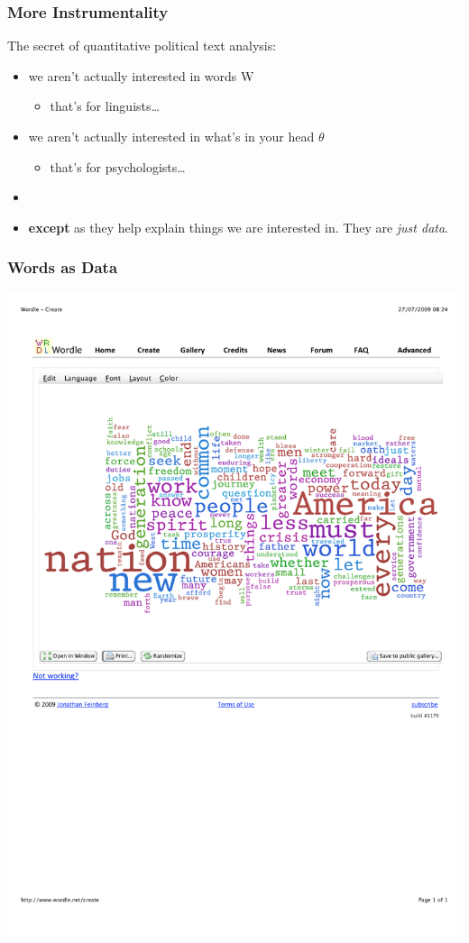 \documentclass[11pt,compress,professionalfonts]{beamer}
\newcommand{\ita}{\begin{itemize}}
\newcommand{\itm}{\item[]}
\newcommand{\itz}{\end{itemize}}
\begin{document}
\begin{frame}[t]\frametitle{More Instrumentality}

The secret of quantitative political text analysis:
\ita
\itm we aren't actually interested in words W
\ita
\itm that's for linguists\ldots
\itz
\itm we aren't actually interested in what's in your head $\theta$
\ita
\itm that's for psychologists\ldots
\itz
\itm
\itm \textbf{except} as they help explain things we are interested in.  They are \textit{just data}.
\itz


%
%
%

\end{frame}
\begin{frame}[t]\frametitle{Words as Data}
\begin{center}
\includegraphics[scale=1.2]{pictures/obamawordle}
\end{center}


\end{frame}
\end{document}
